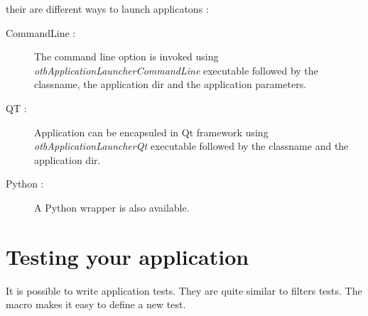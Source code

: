 their are different ways to launch applicatons :

\begin{description}
\item[CommandLine :] The command line option is invoked using \emph{otbApplicationLauncherCommandLine} executable followed by the classname, the application dir and the application parameters.
\item[QT :] Application can be encapsuled in Qt framework using \emph{otbApplicationLauncherQt} executable followed by the classname and the application dir.
\item[Python :] A Python wrapper is also available.
\end{description}


\section{Testing your application}
\label{sec:appTesting}
It is possible to write application tests. They are quite similar to filters tests.
The macro  makes it easy to define a new test.
